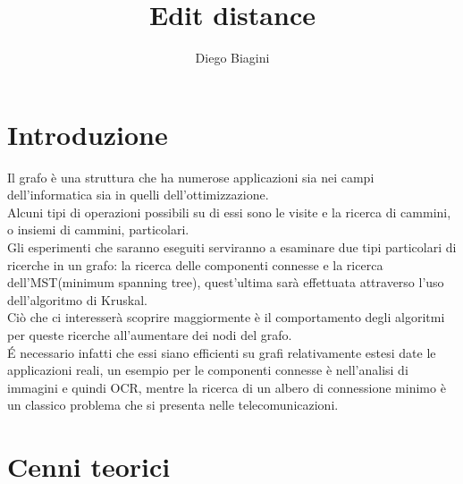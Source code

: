 \documentclass[]{article}
\author{Diego Biagini}
\title{Edit distance}
\begin{document}
\maketitle
\newpage
\section{Introduzione}
Il grafo è una struttura che ha numerose applicazioni sia nei campi dell'informatica sia in quelli dell'ottimizzazione.\\
Alcuni tipi di operazioni possibili su di essi sono le visite e la ricerca di cammini, o insiemi di cammini, particolari.\\
Gli esperimenti che saranno eseguiti serviranno a esaminare due tipi particolari di ricerche in un grafo: la ricerca delle componenti connesse e la ricerca dell'MST(minimum spanning tree), quest'ultima sarà effettuata attraverso l'uso dell'algoritmo di Kruskal.\\
Ciò che ci interesserà scoprire maggiormente è il comportamento degli algoritmi per queste ricerche all'aumentare dei nodi del grafo.\\
\'E necessario infatti che essi siano efficienti su grafi relativamente estesi date le applicazioni reali, un esempio per le componenti connesse è nell'analisi di immagini e quindi OCR, mentre la ricerca di un albero di connessione minimo è un classico problema che si presenta nelle telecomunicazioni.\\ 
\section{Cenni teorici}
\end{document}
